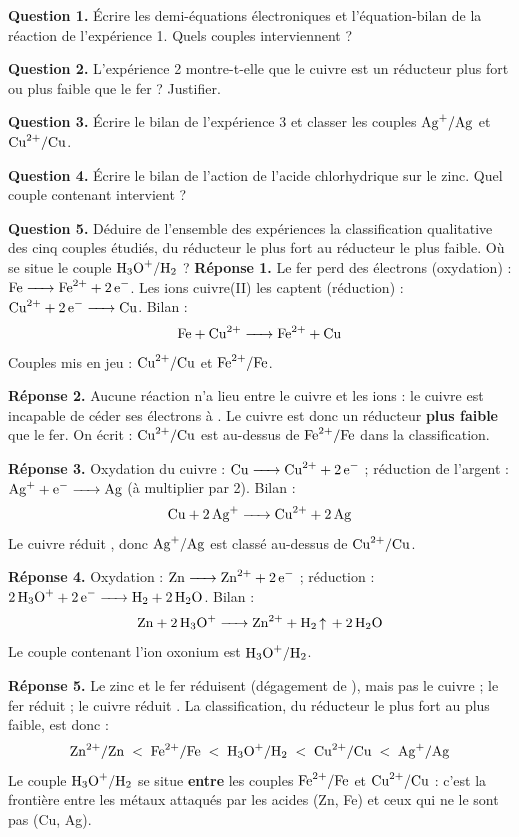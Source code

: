 \documentclass[11pt]{article}
\begin{document}
\begin{exoresolu}
\textbf{Question 1.} Écrire les demi-équations électroniques et l'équation-bilan de la réaction de l'expérience 1. Quels couples interviennent ?

\textbf{Question 2.} L'expérience 2 montre-t-elle que le cuivre est un réducteur plus fort ou plus faible que le fer ? Justifier.

\textbf{Question 3.} Écrire le bilan de l'expérience 3 et classer les couples $\ce{Ag+}/\ce{Ag}$ et $\ce{Cu^2+}/\ce{Cu}$.

\textbf{Question 4.} Écrire le bilan de l'action de l'acide chlorhydrique sur le zinc. Quel couple contenant  intervient ?

\textbf{Question 5.} Déduire de l'ensemble des expériences la classification qualitative des cinq couples étudiés, du réducteur le plus fort au réducteur le plus faible. Où se situe le couple $\ce{H3O+}/\ce{H2}$ ?
\tcblower
\textbf{Réponse 1.} Le fer perd des électrons (oxydation) : $\ce{Fe -> Fe^2+ + 2e-}$. Les ions cuivre(II) les captent (réduction) : $\ce{Cu^2+ + 2e- -> Cu}$. Bilan :
\[ \ce{Fe + Cu^2+ -> Fe^2+ + Cu} \]
Couples mis en jeu : $\ce{Cu^2+}/\ce{Cu}$ et $\ce{Fe^2+}/\ce{Fe}$.

\textbf{Réponse 2.} Aucune réaction n'a lieu entre le cuivre et les ions  : le cuivre est incapable de céder ses électrons à . Le cuivre est donc un réducteur \textbf{plus faible} que le fer. On écrit : $\ce{Cu^2+}/\ce{Cu}$ est au-dessus de $\ce{Fe^2+}/\ce{Fe}$ dans la classification.

\textbf{Réponse 3.} Oxydation du cuivre : $\ce{Cu -> Cu^2+ + 2e-}$ ; réduction de l'argent : $\ce{Ag+ + e- -> Ag}$ (à multiplier par 2). Bilan :
\[ \ce{Cu + 2Ag+ -> Cu^2+ + 2Ag} \]
Le cuivre réduit , donc $\ce{Ag+}/\ce{Ag}$ est classé au-dessus de $\ce{Cu^2+}/\ce{Cu}$.

\textbf{Réponse 4.} Oxydation : $\ce{Zn -> Zn^2+ + 2e-}$ ; réduction : $\ce{2H3O+ + 2e- -> H2 + 2H2O}$. Bilan :
\[ \ce{Zn + 2H3O+ -> Zn^2+ + H2 ^ + 2H2O} \]
Le couple contenant l'ion oxonium est $\ce{H3O+}/\ce{H2}$.

\textbf{Réponse 5.} Le zinc et le fer réduisent  (dégagement de ), mais pas le cuivre ; le fer réduit  ; le cuivre réduit . La classification, du réducteur le plus fort au plus faible, est donc :
\[ \ce{Zn^2+}/\ce{Zn} \;<\; \ce{Fe^2+}/\ce{Fe} \;<\; \ce{H3O+}/\ce{H2} \;<\; \ce{Cu^2+}/\ce{Cu} \;<\; \ce{Ag+}/\ce{Ag} \]
Le couple $\ce{H3O+}/\ce{H2}$ se situe \textbf{entre} les couples $\ce{Fe^2+}/\ce{Fe}$ et $\ce{Cu^2+}/\ce{Cu}$ : c'est la frontière entre les métaux attaqués par les acides (Zn, Fe) et ceux qui ne le sont pas (Cu, Ag).
\end{exoresolu}
\end{document}
